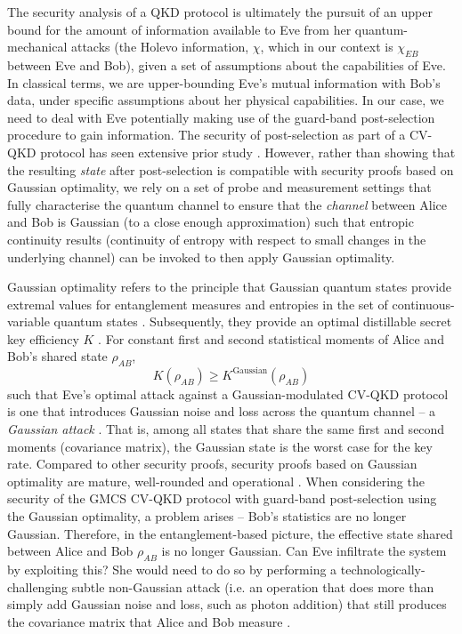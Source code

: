 ﻿\documentclass[12pt]{article}
\begin{document}
The security analysis of a QKD protocol is ultimately the pursuit of an upper bound for the amount of information available to Eve from her quantum-mechanical attacks (the Holevo information, $\chi$, which in our context is $\chi_{EB}$ between Eve and Bob), given a set of assumptions about the capabilities of Eve. In classical terms, we are upper-bounding Eve's mutual information with Bob's data, under specific assumptions about her physical capabilities. In our case, we need to deal with Eve potentially making use of the guard-band post-selection procedure to gain information. The security of post-selection as part of a CV-QKD protocol has seen extensive prior study \cite{Fiurasek-2012, Walk-2013, Hosseinidehaj-2020, Heid-2007, Heid-2006, Silberhorn-2002, Blandino-2012}. However, rather than showing that the resulting \textit{state} after post-selection is compatible with security proofs based on Gaussian optimality, we rely on a set of probe and measurement settings that fully characterise the quantum channel to ensure that the \textit{channel} between Alice and Bob is Gaussian (to a close enough approximation) such that entropic continuity results (continuity of entropy with respect to small changes in the underlying channel) can be invoked to then apply Gaussian optimality.

Gaussian optimality refers to the principle that Gaussian quantum states provide extremal values for entanglement measures and entropies in the set of continuous-variable quantum states \cite{Wolf-2006}. Subsequently, they provide an optimal distillable secret key efficiency $K$ \cite{Wolf-2006}. For constant first and second statistical moments of Alice and Bob's shared state $\rho_{AB}$,
\begin{equation}
\label{eq: gaussian optimality}
K(\rho_{AB}) \geq K^\text{Gaussian}(\rho_{AB})
\end{equation}
such that Eve's optimal attack against a Gaussian-modulated CV-QKD protocol is one that introduces Gaussian noise and loss across the quantum channel -- a \textit{Gaussian attack} \cite{Garcia-Patron-2006, Navascues-2006}. That is, among all states that share the same first and second moments (covariance matrix), the Gaussian state is the worst case for the key rate. Compared to other security proofs, security proofs based on Gaussian optimality are mature, well-rounded and operational \cite{Usenko-2025}. When considering the security of the GMCS CV-QKD protocol with guard-band post-selection using the Gaussian optimality, a problem arises -- Bob's statistics are no longer Gaussian. Therefore, in the entanglement-based picture, the effective state shared between Alice and Bob $\rho_{AB}$ is no longer Gaussian. Can Eve infiltrate the system by exploiting this? She would need to do so by performing a technologically-challenging subtle non-Gaussian attack (i.e. an operation that does more than simply add Gaussian noise and loss, such as photon addition) that still produces the covariance matrix that Alice and Bob measure \cite{Usenko-2025}.
\end{document}
